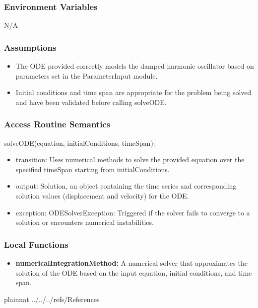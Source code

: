 \documentclass[12pt, titlepage]{article}
\begin{document}
\subsubsection{Environment Variables}
N/A

\subsubsection{Assumptions}

\begin{itemize}
  \item The ODE provided correctly models the damped harmonic oscillator based on parameters set in the ParameterInput module.
  \item Initial conditions and time span are appropriate for the problem being solved and have been validated before calling solveODE.
\end{itemize}

\subsubsection{Access Routine Semantics}

\noindent solveODE(equation, initialConditions, timeSpan):
\begin{itemize}
\item transition: Uses numerical methods to solve the provided equation over the specified timeSpan starting from initialConditions.
\item output: Solution, an object containing the time series and corresponding solution values (displacement and velocity) for the ODE.
\item exception: ODESolverException: Triggered if the solver fails to converge to a solution or encounters numerical instabilities.
\end{itemize}

\subsubsection{Local Functions}

\begin{itemize}
  \item \textbf{numericalIntegrationMethod:} A numerical solver that approximates the solution of the ODE based on the input equation, initial conditions, and time span.
\end{itemize}


\newpage

 {plainnat}
 {../../../refs/References}
\end{document}
